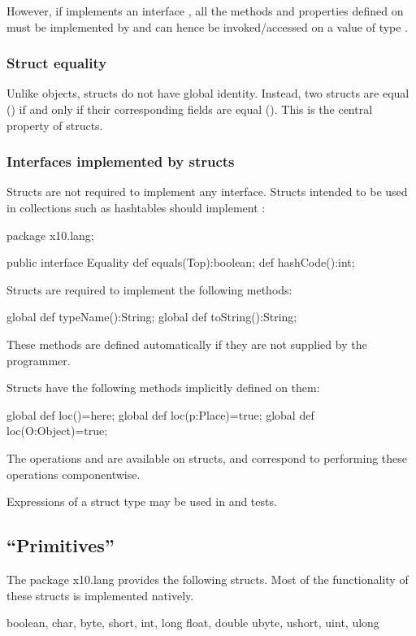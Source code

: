 However,
if  implements an interface , all the methods and properties defined
on  must be implemented by  and can hence be invoked/accessed on a
value of type . 

\subsubsection{Struct equality}

Unlike objects, structs do not have global identity. Instead, two
structs are equal (\Xcd{==}) if and only if their corresponding fields are
equal (\Xcd{==}). This is the central property of structs.

\subsubsection{Interfaces implemented by structs}
Structs are not required to implement any interface. Structs intended
to be used in collections such as hashtables should implement
:
\begin{x10}
package x10.lang;  

public interface Equality {
    def equals(Top):boolean;
    def hashCode():int;
}
\end{x10}
Structs are required to implement the following methods: 
\begin{x10}
  global def typeName():String;
  global def toString():String;  
\end{x10}
These methods are defined automatically if they are not supplied by the programmer.

Structs have the following methods implicitly defined on them:
\begin{x10}
  global def loc()=here;
  global def loc(p:Place)=true;
  global def loc(O:Object)=true;
\end{x10}

The operations \Xcd{==} and \Xcd{!=} are available on structs, and
correspond to performing these operations componentwise.

Expressions  of a struct type may be used in  and  tests.

\subsection{``Primitives''}

The package x10.lang provides the following structs. Most of the functionality of these structs is implemented natively. 
\begin{x10}
boolean, char, 
byte, short, int, long
float, double
ubyte, ushort, uint, ulong
\end{x10}
 
